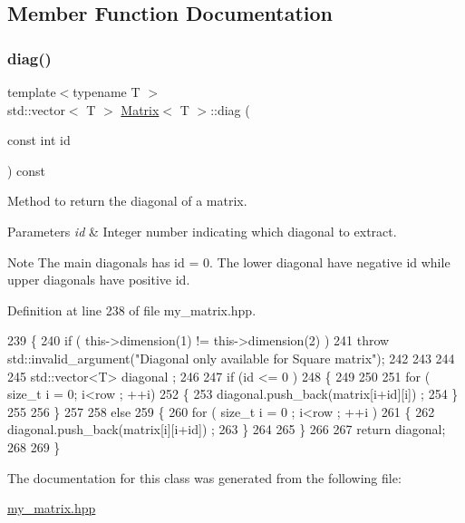 \subsection{Member Function Documentation}
\mbox{\label{classMatrix_afdc70f8e656996481f5a6b970189c64b}} 
\subsubsection{\texorpdfstring{diag()}{diag()}}
{\footnotesize\ttfamily template$<$typename T $>$ \\
std\+::vector$<$ T $>$ \hyperlink{classMatrix}{Matrix}$<$ T $>$\+::diag (\begin{DoxyParamCaption}\item[{const int}]{id }\end{DoxyParamCaption}) const}



Method to return the diagonal of a matrix. 


\begin{DoxyParams}{Parameters}
{\em id} & Integer number indicating which diagonal to extract. \\
\hline
\end{DoxyParams}
\begin{DoxyNote}{Note}
The main diagonals has id = 0. The lower diagonal have negative id while upper diagonals have positive id. 
\end{DoxyNote}


Definition at line 238 of file my\+\_\+matrix.\+hpp.


\begin{DoxyCode}
239 \{
240     \textcolor{keywordflow}{if} ( this->dimension(1) != this->dimension(2) ) 
241         \textcolor{keywordflow}{throw} std::invalid\_argument(\textcolor{stringliteral}{"Diagonal only available for Square matrix"});  
242 
243 
244 
245     std::vector<T> diagonal ; 
246 
247     \textcolor{keywordflow}{if} (\textcolor{keywordtype}{id} <= 0 ) 
248 \{
249         
250     
251     \textcolor{keywordflow}{for} ( \textcolor{keywordtype}{size\_t} i = 0; i<row ; ++i)
252     \{ 
253             diagonal.push\_back(matrix[i+\textcolor{keywordtype}{id}][i]) ; 
254     \}
255 
256 \}   
257     
258     \textcolor{keywordflow}{else}
259 \{
260     \textcolor{keywordflow}{for} ( \textcolor{keywordtype}{size\_t} i = 0 ; i<row ; ++i ) 
261     \{   
262         diagonal.push\_back(matrix[i][i+\textcolor{keywordtype}{id}]) ; 
263     \}
264 
265 \}
266 
267 \textcolor{keywordflow}{return} diagonal; 
268 
269 \}
\end{DoxyCode}


The documentation for this class was generated from the following file\+:\begin{DoxyCompactItemize}
\item 
\hyperlink{my__matrix_8hpp}{my\+\_\+matrix.\+hpp}\end{DoxyCompactItemize}
